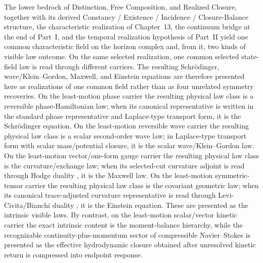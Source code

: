The lower bedrock of Distinction, Free Composition, and Realized Closure,
together with its derived Constancy / Existence / Incidence / Closure-Balance
structure, the characteristic realization of Chapter~13, the continuum bridge
at the end of Part~I, and the temporal realization hypothesis of Part~II yield one
common characteristic field on the horizon complex and, from it, two kinds of
visible law outcome. On the same selected realization, one common selected
state-field law is read through different carriers. The resulting
Schr\"odinger, wave/Klein--Gordon, Maxwell, and Einstein equations are
therefore presented here as realizations of one common field rather than as
four unrelated symmetry recoveries. On the
least-motion phase carrier the resulting physical law class is a reversible
phase-Hamiltonian law; when its canonical representative is written in the
standard phase representative and Laplace-type transport form, it is the
Schr\"odinger equation. On the least-motion reversible wave carrier the
resulting physical law class is a scalar second-order wave law; in
Laplace-type transport form with scalar mass/potential closure, it is the
scalar wave/Klein--Gordon law. On the least-motion vector/one-form gauge
carrier the resulting physical law class is the curvature/exchange law; when
its selected-cut curvature adjoint is read through Hodge duality
\cite{Maxwell1865,Jackson1999}, it is the Maxwell law. On the least-motion
symmetric-tensor carrier the resulting
physical law class is the covariant geometric law; when its canonical
trace-adjusted curvature representative is read through Levi-Civita/Bianchi
duality \cite{Einstein1915,Wald1984}, it is the Einstein equation. These are
presented as the intrinsic
visible laws. By contrast,
on the least-motion scalar/vector kinetic carrier the exact intrinsic content
is the moment-balance hierarchy, while the recognizable continuity-plus-momentum
sector of compressible Navier--Stokes is presented as the effective
hydrodynamic closure obtained after unresolved kinetic return is compressed
into endpoint response.

